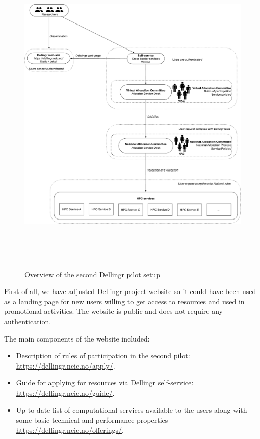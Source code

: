 \documentclass{article}
\begin{document}
\begin{figure}
\centering
\includegraphics[height=450pt]{diagram.pdf}
\caption{Overview of the second Dellingr pilot setup}
\end{figure}


First of all, we have adjusted Dellingr project website so it could have been used as a landing page for new users willing to get access to resources and used in promotional activities. The website is public and does not require any authentication.

The main components of the website included:
\begin{itemize}
    \item Description of rules of participation in the second pilot: \url{https://dellingr.neic.no/apply/}.
    \item Guide for applying for resources via Dellingr self-service: \url{https://dellingr.neic.no/guide/}.
    \item Up to date list of computational services available to the users along with some basic technical and performance properties \url{https://dellingr.neic.no/offerings/}.
\end{itemize}
\end{document}
